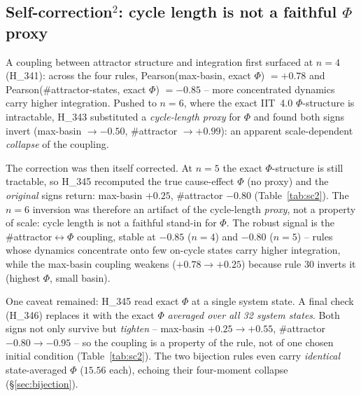 \documentclass[11pt,a4paper]{article}
\begin{document}
\subsection{Self-correction\texorpdfstring{$^2$}{2}: cycle length is not a faithful \texorpdfstring{$\Phi$}{Phi} proxy}
\label{sec:self-correction}
A coupling between attractor structure and integration first surfaced at
$n=4$ (H\_341): across the four rules, Pearson(max-basin, exact $\Phi$)
$=+0.78$ and Pearson(\#attractor-states, exact $\Phi$) $=-0.85$ --
more concentrated dynamics carry higher integration. Pushed to $n=6$,
where the exact IIT~4.0 $\Phi$-structure is intractable, H\_343
substituted a \emph{cycle-length proxy} for $\Phi$ and found both signs
invert (max-basin $\to -0.50$, \#attractor $\to +0.99$): an apparent
scale-dependent \emph{collapse} of the coupling.

\noindent The correction was then itself corrected. At $n=5$ the exact
$\Phi$-structure is still tractable, so H\_345 recomputed the true
cause-effect $\Phi$ (no proxy) and the \emph{original} signs return:
max-basin $+0.25$, \#attractor $-0.80$ (Table~\ref{tab:sc2}). The $n=6$
inversion was therefore an artifact of the cycle-length \emph{proxy},
not a property of scale: cycle length is not a faithful stand-in for
$\Phi$. The robust signal is the \#attractor$\leftrightarrow\Phi$
coupling, stable at $-0.85$ ($n=4$) and $-0.80$ ($n=5$) -- rules whose
dynamics concentrate onto few on-cycle states carry higher integration,
while the max-basin coupling weakens ($+0.78 \to +0.25$) because rule 30
inverts it (highest $\Phi$, small basin).

\noindent One caveat remained: H\_345 read exact $\Phi$ at a single
system state. A final check (H\_346) replaces it with the exact $\Phi$
\emph{averaged over all 32 system states}. Both signs not only survive
but \emph{tighten} -- max-basin $+0.25 \to +0.55$,
\#attractor $-0.80 \to -0.95$ -- so the coupling is a property of the
rule, not of one chosen initial condition (Table~\ref{tab:sc2}). The
two bijection rules even carry \emph{identical} state-averaged $\Phi$
($15.56$ each), echoing their four-moment collapse (\S\ref{sec:bijection}).
\end{document}

